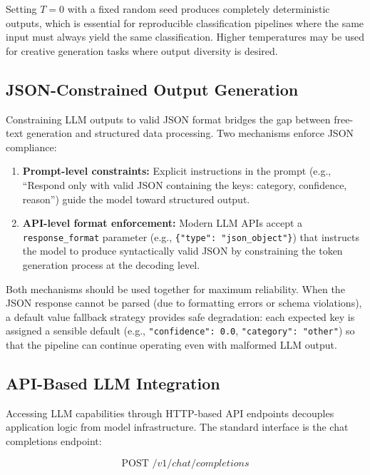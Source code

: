 \documentclass[10pt,a4paper]{article}
\begin{document}
Setting $T = 0$ with a fixed random seed produces completely deterministic outputs, which is essential for reproducible classification pipelines where the same input must always yield the same classification. Higher temperatures may be used for creative generation tasks where output diversity is desired.

\subsection{JSON-Constrained Output Generation}
\label{sec:json-constrained}

Constraining LLM outputs to valid JSON format bridges the gap between free-text generation and structured data processing. Two mechanisms enforce JSON compliance:

\begin{enumerate}
    \item \textbf{Prompt-level constraints:} Explicit instructions in the prompt (e.g., ``Respond only with valid JSON containing the keys: category, confidence, reason'') guide the model toward structured output.
    \item \textbf{API-level format enforcement:} Modern LLM APIs accept a \texttt{response\_format} parameter (e.g., \texttt{\{"type": "json\_object"\}}) that instructs the model to produce syntactically valid JSON by constraining the token generation process at the decoding level.
\end{enumerate}

Both mechanisms should be used together for maximum reliability. When the JSON response cannot be parsed (due to formatting errors or schema violations), a default value fallback strategy provides safe degradation: each expected key is assigned a sensible default (e.g., \texttt{"confidence": 0.0}, \texttt{"category": "other"}) so that the pipeline can continue operating even with malformed LLM output.

\subsection{API-Based LLM Integration}
\label{sec:api-llm}

Accessing LLM capabilities through HTTP-based API endpoints decouples application logic from model infrastructure. The standard interface is the chat completions endpoint:

\begin{equation}
\text{POST } /v1/chat/completions
\label{eq:api-endpoint}
\end{equation}
\end{document}

